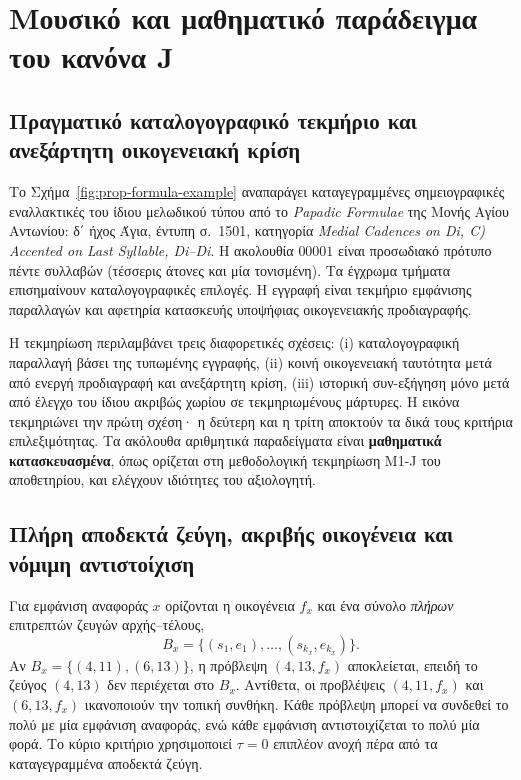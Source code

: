 \documentclass[11pt,a4paper]{article}
\begin{document}
\section{Μουσικό και μαθηματικό παράδειγμα του κανόνα J}\label{app:worked-examples}

\subsection{Πραγματικό καταλογογραφικό τεκμήριο και ανεξάρτητη οικογενειακή κρίση}
Το Σχήμα~\ref{fig:prop-formula-example} αναπαράγει καταγεγραμμένες σημειογραφικές εναλλακτικές του ίδιου μελωδικού τύπου από το \emph{Papadic Formulae} της Μονής Αγίου Αντωνίου: δ΄ ήχος Άγια, έντυπη σ.~1501, κατηγορία \emph{Medial Cadences on Di, C) Accented on Last Syllable, Di--Di}. Η ακολουθία $00001$ είναι προσωδιακό πρότυπο πέντε συλλαβών (τέσσερις άτονες και μία τονισμένη). Τα έγχρωμα τμήματα επισημαίνουν καταλογογραφικές επιλογές. Η εγγραφή είναι τεκμήριο εμφάνισης παραλλαγών και αφετηρία κατασκευής υποψήφιας οικογενειακής προδιαγραφής.

Η τεκμηρίωση περιλαμβάνει τρεις διαφορετικές σχέσεις: (i) καταλογογραφική παραλλαγή βάσει της τυπωμένης εγγραφής, (ii) κοινή οικογενειακή ταυτότητα μετά από ενεργή προδιαγραφή και ανεξάρτητη κρίση, (iii) ιστορική συν-εξήγηση μόνο μετά από έλεγχο του ίδιου ακριβώς χωρίου σε τεκμηριωμένους μάρτυρες. Η εικόνα τεκμηριώνει την πρώτη σχέση· η δεύτερη και η τρίτη αποκτούν τα δικά τους κριτήρια επιλεξιμότητας. Τα ακόλουθα αριθμητικά παραδείγματα είναι \textbf{μαθηματικά κατασκευασμένα}, όπως ορίζεται στη μεθοδολογική τεκμηρίωση Μ1-J του αποθετηρίου, και ελέγχουν ιδιότητες του αξιολογητή.

\subsection{Πλήρη αποδεκτά ζεύγη, ακριβής οικογένεια και νόμιμη αντιστοίχιση}
Για εμφάνιση αναφοράς $x$ ορίζονται η οικογένεια $f_x$ και ένα σύνολο \emph{πλήρων} επιτρεπτών ζευγών αρχής--τέλους,
\[
 B_x=\{(s_1,e_1),\ldots,(s_{k_x},e_{k_x})\}.
\]
Αν $B_x=\{(4,11),(6,13)\}$, η πρόβλεψη $(4,13,f_x)$ αποκλείεται, επειδή το ζεύγος $(4,13)$ δεν περιέχεται στο $B_x$. Αντίθετα, οι προβλέψεις $(4,11,f_x)$ και $(6,13,f_x)$ ικανοποιούν την τοπική συνθήκη. Κάθε πρόβλεψη μπορεί να συνδεθεί το πολύ με μία εμφάνιση αναφοράς, ενώ κάθε εμφάνιση αντιστοιχίζεται το πολύ μία φορά. Το κύριο κριτήριο χρησιμοποιεί $\tau=0$ επιπλέον ανοχή πέρα από τα καταγεγραμμένα αποδεκτά ζεύγη.
\end{document}
